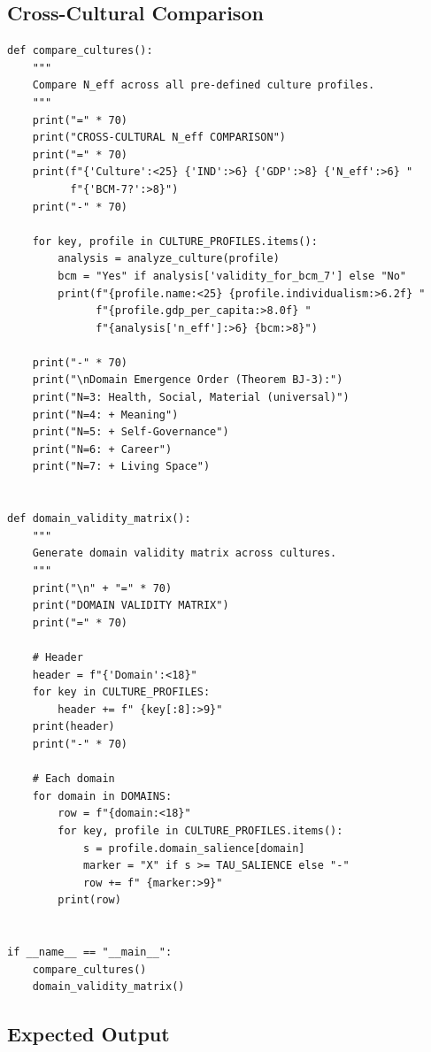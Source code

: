 \subsection{Cross-Cultural Comparison}

\begin{verbatim}
def compare_cultures():
    """
    Compare N_eff across all pre-defined culture profiles.
    """
    print("=" * 70)
    print("CROSS-CULTURAL N_eff COMPARISON")
    print("=" * 70)
    print(f"{'Culture':<25} {'IND':>6} {'GDP':>8} {'N_eff':>6} "
          f"{'BCM-7?':>8}")
    print("-" * 70)

    for key, profile in CULTURE_PROFILES.items():
        analysis = analyze_culture(profile)
        bcm = "Yes" if analysis['validity_for_bcm_7'] else "No"
        print(f"{profile.name:<25} {profile.individualism:>6.2f} "
              f"{profile.gdp_per_capita:>8.0f} "
              f"{analysis['n_eff']:>6} {bcm:>8}")

    print("-" * 70)
    print("\nDomain Emergence Order (Theorem BJ-3):")
    print("N=3: Health, Social, Material (universal)")
    print("N=4: + Meaning")
    print("N=5: + Self-Governance")
    print("N=6: + Career")
    print("N=7: + Living Space")


def domain_validity_matrix():
    """
    Generate domain validity matrix across cultures.
    """
    print("\n" + "=" * 70)
    print("DOMAIN VALIDITY MATRIX")
    print("=" * 70)

    # Header
    header = f"{'Domain':<18}"
    for key in CULTURE_PROFILES:
        header += f" {key[:8]:>9}"
    print(header)
    print("-" * 70)

    # Each domain
    for domain in DOMAINS:
        row = f"{domain:<18}"
        for key, profile in CULTURE_PROFILES.items():
            s = profile.domain_salience[domain]
            marker = "X" if s >= TAU_SALIENCE else "-"
            row += f" {marker:>9}"
        print(row)


if __name__ == "__main__":
    compare_cultures()
    domain_validity_matrix()
\end{verbatim}

\subsection{Expected Output}

